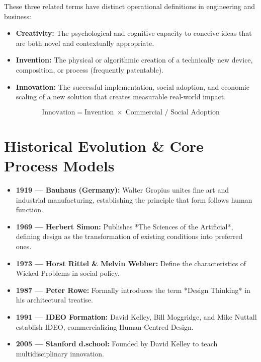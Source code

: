 These three related terms have distinct operational definitions in engineering and business:
\begin{itemize}[leftmargin=1.2em, itemsep=3pt]
    \item \textbf{Creativity:} The psychological and cognitive capacity to conceive ideas that are both novel and contextually appropriate.
    \item \textbf{Invention:} The physical or algorithmic creation of a technically new device, composition, or process (frequently patentable).
    \item \textbf{Innovation:} The successful implementation, social adoption, and economic scaling of a new solution that creates measurable real-world impact.
\end{itemize}

\begin{equation}
\text{Innovation} = \text{Invention} \;\times\; \text{Commercial / Social Adoption}
\end{equation}

\section{Historical Evolution \& Core Process Models}

\begin{itemize}[leftmargin=1.2em, itemsep=3pt]
    \item \textbf{1919 --- Bauhaus (Germany):} Walter Gropius unites fine art and industrial manufacturing, establishing the principle that form follows human function.
    \item \textbf{1969 --- Herbert Simon:} Publishes *The Sciences of the Artificial*, defining design as the transformation of existing conditions into preferred ones.
    \item \textbf{1973 --- Horst Rittel \& Melvin Webber:} Define the characteristics of Wicked Problems in social policy.
    \item \textbf{1987 --- Peter Rowe:} Formally introduces the term *Design Thinking* in his architectural treatise.
    \item \textbf{1991 --- IDEO Formation:} David Kelley, Bill Moggridge, and Mike Nuttall establish IDEO, commercializing Human-Centred Design.
    \item \textbf{2005 --- Stanford d.school:} Founded by David Kelley to teach multidisciplinary innovation.
\end{itemize}

